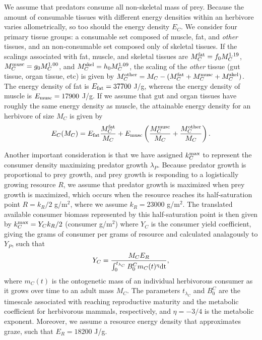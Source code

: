 \documentclass[onecolumn,preprintnumbers,amsmath,amssymb,superscriptaddress]{revtex4}
\begin{document}
We assume that predators consume all non-skeletal mass of prey. 
Because the amount of consumable tissues with different energy densities within an herbivore varies allometrically, so too should the energy density $E_C$.
We consider four primary tissue groups: a consumable set composed of muscle, fat, and \emph{other} tissues, and an non-consumable set composed only of skeletal tissues.
If the scalings associated with fat, muscle, and skeletal tissues are $M_C^{\rm fat}=f_0 M_C^{1.19}$, $M_C^{\rm musc} = g_0 M_C^{1.00}$, and $M_C^{\rm skel} = h_0 M_C^{1.09}$, the scaling of the \emph{other} tissue (gut tissue, organ tissue, etc) is given by $M_C^{\rm other} = M_C - (M_C^{\rm fat} + M_C^{\rm musc} + M_C^{\rm skel})$.
The energy density of fat is $E_{\rm fat} = 37700$ J/g, whereas the energy density of muscle is $E_{\rm musc} = 17900$ J/g.
If we assume that gut and organ tissues have roughly the same energy density as muscle, the attainable energy density for an herbivore of size $M_C$ is given by
\begin{equation}
	E_C(M_C) = E_{\rm fat}\frac{M_C^{\rm fat}}{M_C} + E_{\rm musc}\left(\frac{M_C^{\rm musc}}{M_C} + \frac{M_C^{\rm other}}{M_C} \right).
\end{equation}

Another important consideration is that we have assigned $k_C^{\rm max}$ to represent the consumer density maximizing predator growth $\lambda_P$.
Because predator growth is proportional to prey growth, and prey growth is responding to a logistically growing resource $R$, we assume that predator growth is maximized when prey growth is maximized, which occurs when the resource reaches its half-saturation point $R = k_R/2$ g/m${}^2$, where we assume $k_R = 23000$ g/m${}^2$.
The translated available consumer biomass represented by this half-saturation point is then given by $k_C^{\rm max} = Y_C k_R/2$ (consumer g/m${}^2$) where $Y_C$ is the consumer yield coefficient, giving the grams of consumer per grams of resource and calculated analagously to $Y_P$, such that
\begin{equation}
	Y_C = \frac{M_C E_R}{\int_0^{t_{\lambda_C}}B_0^C m_C(t)^\eta {\rm dt}},
\end{equation}
where $m_C(t)$ is the ontogenetic mass of an individual herbivorous consumer as it grows over time to an adult mass $M_C$.
The parameters $t_{\lambda_C}$ and $B_0^C$ are the timescale associated with reaching reproductive maturity and the metabolic coefficient for herbivorous mammals, respectively, and $\eta=-3/4$ is the metabolic exponent.
Moreover, we assume a resource energy density that approximates graze, such that $E_R = 18200$ J/g.
\end{document}
